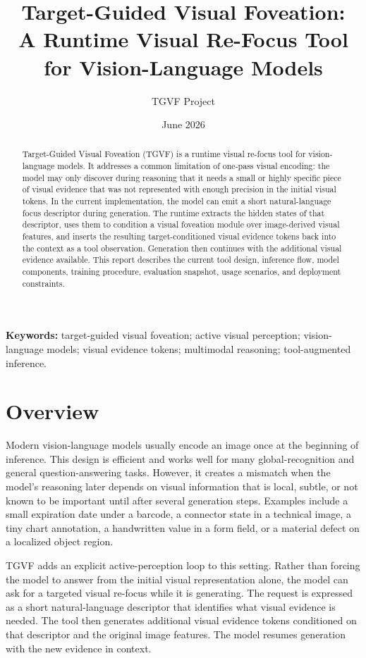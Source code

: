 \documentclass[10pt,twocolumn]{article}
\title{\bfseries Target-Guided Visual Foveation:\\
A Runtime Visual Re-Focus Tool for Vision-Language Models}
\author{TGVF Project}
\date{June 2026}
\newcommand{\method}{TGVF}
\begin{document}
\maketitle

\begin{abstract}
Target-Guided Visual Foveation (\method{}) is a runtime visual re-focus tool for vision-language models. It addresses a common limitation of one-pass visual encoding: the model may only discover during reasoning that it needs a small or highly specific piece of visual evidence that was not represented with enough precision in the initial visual tokens. In the current implementation, the model can emit a short natural-language focus descriptor during generation. The runtime extracts the hidden states of that descriptor, uses them to condition a visual foveation module over image-derived visual features, and inserts the resulting target-conditioned visual evidence tokens back into the context as a tool observation. Generation then continues with the additional visual evidence available. This report describes the current tool design, inference flow, model components, training procedure, evaluation snapshot, usage scenarios, and deployment constraints.
\end{abstract}

\noindent\textbf{Keywords:} target-guided visual foveation; active visual perception; vision-language models; visual evidence tokens; multimodal reasoning; tool-augmented inference.

\section{Overview}

Modern vision-language models usually encode an image once at the beginning of inference. This design is efficient and works well for many global-recognition and general question-answering tasks. However, it creates a mismatch when the model's reasoning later depends on visual information that is local, subtle, or not known to be important until after several generation steps. Examples include a small expiration date under a barcode, a connector state in a technical image, a tiny chart annotation, a handwritten value in a form field, or a material defect on a localized object region.

\method{} adds an explicit active-perception loop to this setting. Rather than forcing the model to answer from the initial visual representation alone, the model can ask for a targeted visual re-focus while it is generating. The request is expressed as a short natural-language descriptor that identifies what visual evidence is needed. The tool then generates additional visual evidence tokens conditioned on that descriptor and the original image features. The model resumes generation with the new evidence in context.
\end{document}
